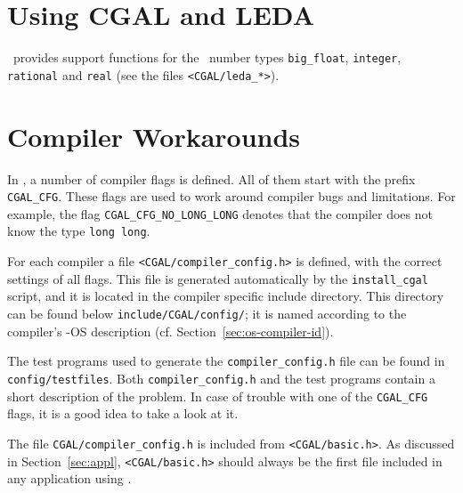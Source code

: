 
\section{Using CGAL and LEDA\label{sec:leda}}

\cgal\ provides support functions  for the \leda\ number types
  \texttt{big\_float}, \texttt{integer}, \texttt{rational} and
  \texttt{real} (see the files \texttt{<CGAL/leda\_*>}).

\section{Compiler Workarounds}

In \cgal, a number of compiler flags is defined. All of them start
with the prefix \texttt{CGAL\_CFG}. These flags are used to work
around compiler bugs and limitations. For example, the flag
\texttt{CGAL\_CFG\_NO\_LONG\_LONG} denotes that the compiler does not
know the type \texttt{long long}.

For each compiler a file \texttt{<CGAL/compiler\_config.h>}
 is defined, with the correct
settings of all flags. This file is generated automatically by the
\texttt{install\_cgal} script, and it is located in the compiler
specific include directory. This directory can be found below
\texttt{include/CGAL/config/};
 it is named according to the compiler's \cgal-OS
description (cf. Section~\ref{sec:os-compiler-id}).

The test programs used to generate the \texttt{compiler\_config.h}
file can be found in \texttt{config/testfiles}.
 Both
\texttt{compiler\_config.h} and the test programs contain a short
description of the problem. In case of trouble with one of the
\texttt{CGAL\_CFG} flags, it is a good idea to take a look at it.

The file \texttt{CGAL/compiler\_config.h} is included from
\texttt{<CGAL/basic.h>}. As discussed in
Section~\ref{sec:appl}, \texttt{<CGAL/basic.h>} should always be the
first file included in any application using \cgal.

